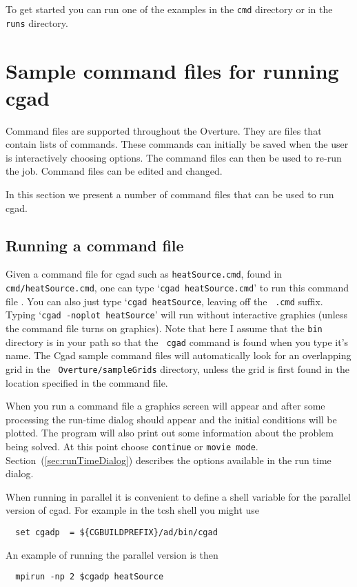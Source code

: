 \documentclass[10pt]{article}
\newcommand{\Index}[1]{#1\index{#1}}
\begin{document}
To get started you can run one of the examples in the {\tt cmd} directory or
in the {\tt runs} directory.

\clearpage
\section{Sample command files for running cgad} \label{sec:demo}

Command files are supported throughout the Overture. They are files
that contain lists of commands. These commands can initially be saved
when the user is interactively choosing options.  The \Index{command files}
can then be used to re-run the job. Command files can be edited and
changed.

In this section we present a number of command files that can be used
to run cgad.

\subsection{Running a command file} \label{sec:runningCommandFiles} 

Given a \Index{command file} for cgad such as {\tt heatSource.cmd}, found in {\tt
cmd/heatSource.cmd}, one can type `{\tt cgad heatSource.cmd}' to run this command
file . You can also just type `{\tt cgad heatSource}, leaving off the {\tt
.cmd} suffix. Typing `{\tt cgad -noplot heatSource}' will run without
interactive graphics (unless the command file turns on graphics). Note that here
I assume that the {\tt bin} directory is in your path so that the {\tt
cgad} command is found when you type it's name. The Cgad sample
command files will automatically look for an overlapping grid in the {\tt
Overture/sampleGrids} directory, unless the grid is first found in the location
specified in the command file.

When you run a command file a graphics screen will appear and after some
processing the run-time dialog should appear and the initial conditions will be
plotted. The program will also print out some information about the problem
being solved. At this point choose {\tt continue} or {\tt movie
mode}. Section~(\ref{sec:runTimeDialog}) describes the options available in the
run time dialog.

When running in parallel it is convenient to define a shell variable for the parallel
version of cgad.
For example in the tcsh shell you might use
\begin{verbatim}
  set cgadp  = ${CGBUILDPREFIX}/ad/bin/cgad
\end{verbatim} %
An example of running the parallel version is then
\begin{verbatim}
  mpirun -np 2 $cgadp heatSource
\end{verbatim} %
\end{document}
